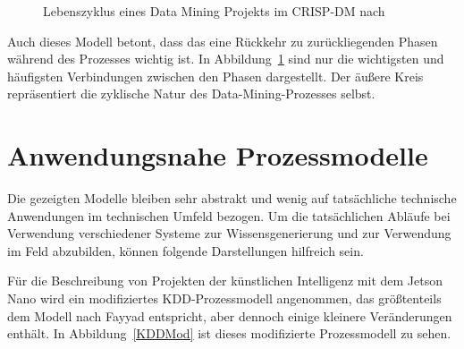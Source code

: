 \begin{figure}[H]
\begin{center}
		\caption{Lebenszyklus eines Data Mining Projekts im CRISP-DM nach \cite{Chapman:2000}} 
		\label{CRISP-DM}
	\end{center}
\end{figure}

Auch dieses Modell betont, dass das eine Rückkehr zu zurückliegenden Phasen während des Prozesses wichtig ist. In Abbildung~\ref{CRISP-DM} sind nur die wichtigsten und häufigsten Verbindungen zwischen den Phasen dargestellt. Der äußere Kreis repräsentiert die zyklische Natur des Data-Mining-Prozesses selbst. \cite{Chapman:2000}

\section{Anwendungsnahe Prozessmodelle}

Die gezeigten Modelle bleiben sehr abstrakt und wenig auf tatsächliche technische Anwendungen im technischen Umfeld bezogen. Um die tatsächlichen Abläufe bei Verwendung verschiedener Systeme zur Wissensgenerierung und zur Verwendung im Feld abzubilden, können folgende Darstellungen hilfreich sein.

Für die Beschreibung von Projekten der künstlichen Intelligenz mit dem Jetson Nano wird ein modifiziertes KDD-Prozessmodell angenommen, das größtenteils dem Modell nach Fayyad entspricht, aber dennoch einige kleinere Veränderungen enthält. In Abbildung~\ref{KDDMod} ist dieses modifizierte Prozessmodell zu sehen.

